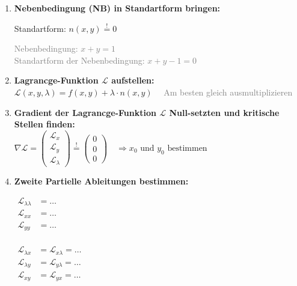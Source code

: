 \begin{enumerate}[itemsep=1ex]
    \item \textbf{Nebenbedingung (NB) in Standartform bringen:}\\
    \begin{minipage}[t]{0.4\columnwidth}
        Standartform: $n(x, y) \stackrel{!}{=} 0$
    \end{minipage}\hfill
    \begin{minipage}[t]{0.6\columnwidth}
            \textcolor{gray}{Nebenbedingung: $x + y = 1$}\\
            \textcolor{gray}{Standartform der Nebenbedingung: $x + y - 1 = 0$}
    \end{minipage}


    \item \textbf{Lagrancge-Funktion $\mathcal{L}$ aufstellen:}\\
    $\mathcal{L}(x, y, \lambda) =
    f(x, y) + \lambda \cdot n(x, y) \,\,\,\,\,\,$ \textcolor{gray}{Am besten gleich ausmultiplizieren}
    

    \item \textbf{Gradient der Lagrancge-Funktion $\mathcal{L}$ Null-setzten und kritische Stellen finden:}\\
    $\nabla \mathcal{L}=
    \begin{pmatrix}
        \mathcal{L}_x\\
        \mathcal{L}_y\\
        \mathcal{L}_\lambda
    \end{pmatrix} \stackrel{!}{=}
    \begin{pmatrix}
        0\\
        0\\
        0
    \end{pmatrix}
    \, \, \, \, \, \,
    \Rightarrow 
    x_0 \text{ und } y_0 \text{ bestimmen}$\\

    \item \textbf{Zweite Partielle Ableitungen bestimmen:}\\
    \begin{minipage}[t]{0.4\columnwidth}
        $\begin{aligned}
            \mathcal{L}_{\lambda \lambda} &= \dots\\
            \mathcal{L}_{xx} &= \dots\\
            \mathcal{L}_{yy} &= \dots\\
        \end{aligned}$
    \end{minipage}\hfill
    \begin{minipage}[c]{0.6\columnwidth}
        $\begin{aligned}
            \mathcal{L}_{\lambda x} &= \mathcal{L}_{x\lambda} = \dots\\
            \mathcal{L}_{\lambda y} &= \mathcal{L}_{y\lambda} = \dots\\
            \mathcal{L}_{xy} &= \mathcal{L}_{yx} = \dots\\
        \end{aligned}$
    \end{minipage}


\end{enumerate}
